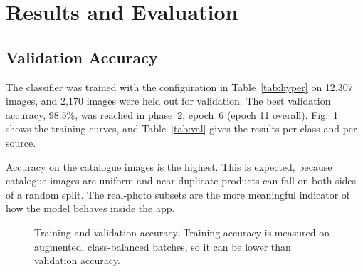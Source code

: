 \documentclass[conference]{IEEEtran}
\begin{document}
\section{Results and Evaluation}
\subsection{Validation Accuracy}
The classifier was trained with the configuration in Table~\ref{tab:hyper} on 12{,}307 images, and 2{,}170 images were held out for validation. The best validation accuracy, 98.5\%, was reached in phase~2, epoch~6 (epoch 11 overall). Fig.~\ref{fig:curve} shows the training curves, and Table~\ref{tab:val} gives the results per class and per source.

Accuracy on the catalogue images is the highest. This is expected, because catalogue images are uniform and near-duplicate products can fall on both sides of a random split. The real-photo subsets are the more meaningful indicator of how the model behaves inside the app.

\begin{figure}[t]
\centering
{}
\caption{Training and validation accuracy. Training accuracy is measured on augmented, class-balanced batches, so it can be lower than validation accuracy.}
\label{fig:curve}
\end{figure}
\end{document}
